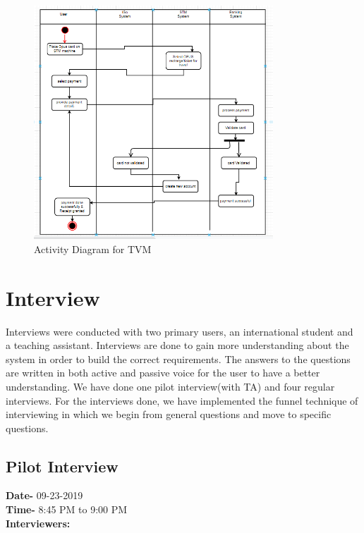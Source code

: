 \documentclass[11pt, english]{report}
\begin{document}
\begin{figure}[H]
  
  \includegraphics[width=0.8\textwidth]{images/Activity.PNG}
  \centering

   \caption{Activity Diagram for TVM}

\end{figure}




\appendix
\chapter{Interview}
Interviews\cite{interview} were conducted with two primary users, an international student and a teaching assistant. Interviews are done to gain more understanding about the system in order to build the correct requirements. The answers to the questions are written in both active and passive voice for the user to have a better understanding. We have done one pilot interview(with TA) and four regular interviews. For the interviews done, we have implemented the funnel technique of interviewing in which we begin from general questions and move to specific questions.


\section{Pilot Interview}
\textbf{Date-} 09-23-2019\\
\textbf{Time-} 8:45 PM to 9:00 PM\\
\textbf{Interviewers:}\\
\end{document}
